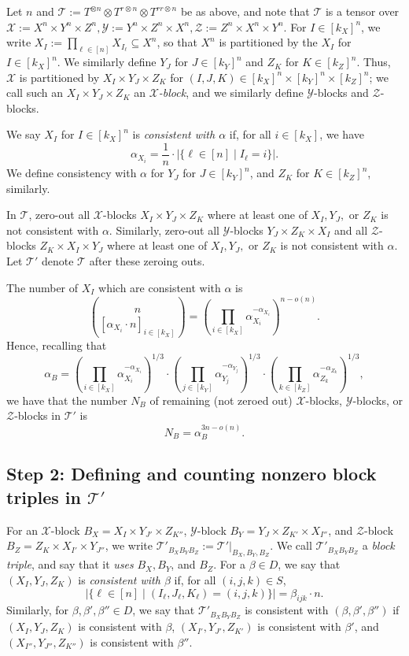 \PassOptionsToPackage{shortlabels}{enumitem}\documentclass[10pt,a4paper]{article}
\newcommand{\T}{\mathcal{T}}
\newcommand{\X}{\mathcal{X}}
\newcommand{\Y}{\mathcal{Y}}
\newcommand{\Z}{\mathcal{Z}}
\begin{document}
Let $n$ and $\T := T^{\otimes n} \otimes T^{r \otimes n} \otimes T^{rr \otimes n}$ be as above, and note that $\T$ is a tensor over $\X := X^n \times Y^n \times Z^n, \Y := Y^n \times Z^n \times X^n, \Z := Z^n \times X^n \times Y^n$. For $I \in [k_X]^n$, we write $X_I := \prod_{\ell \in [n]} X_{I_\ell} \subseteq X^n$, so that $X^n$ is partitioned by the $X_I$ for $I \in [k_X]^n$. We similarly define $Y_J$ for $J \in [k_Y]^n$ and $Z_K$ for $K \in [k_Z]^n$. Thus, $\X$ is partitioned by $X_I \times Y_J \times Z_K$ for $(I,J,K) \in [k_X]^n \times [k_Y]^n \times [k_Z]^n$; we call such an $X_I \times Y_J \times Z_K$ an \emph{$\X$-block}, and we similarly define $\Y$-blocks and $\Z$-blocks.

We say $X_I$ for $I \in [k_X]^n$ is \emph{consistent with $\alpha$} if, for all $i \in [k_X]$, we have $$\alpha_{X_i} = \frac{1}{n} \cdot | \{ \ell \in [n] \mid I_\ell = i \} |.$$ We define consistency with $\alpha$ for $Y_J$ for $J \in [k_Y]^n$, and $Z_K$ for $K \in [k_Z]^n$, similarly.

In $\T$, zero-out all $\X$-blocks $X_I \times Y_J \times Z_K$ where at least one of $X_I,Y_J,$ or $Z_K$ is not consistent with $\alpha$. Similarly, zero-out all $\Y$-blocks $Y_J \times Z_K \times X_I$ and all $\Z$-blocks $Z_K \times X_I \times Y_J$ where at least one of $X_I,Y_J,$ or $Z_K$ is not consistent with $\alpha$. Let $\T'$ denote $\T$ after these zeroing outs.

The number of $X_I$ which are consistent with $\alpha$ is $$\binom{n}{[\alpha_{X_i}\cdot n]_{i \in [k_X]}} = \left( \prod_{i \in [k_X]} \alpha_{X_i}^{-\alpha_{X_i}} \right)^{n - o(n)}.$$
Hence, recalling that $$\alpha_B = \left( \prod_{i \in [k_X]} \alpha_{X_i}^{-\alpha_{X_i}} \right)^{1/3} \cdot \left( \prod_{j \in [k_Y]} \alpha_{Y_j}^{-\alpha_{Y_j}} \right)^{1/3} \cdot \left( \prod_{k \in [k_Z]} \alpha_{Z_k}^{-\alpha_{Z_k}} \right)^{1/3},$$ we have that the number $N_B$ of remaining (not zeroed out) $\X$-blocks, $\Y$-blocks, or $\Z$-blocks in $\T'$ is $$N_B = \alpha_B^{3n - o(n)}.$$

\subsection{Step 2: Defining and counting nonzero block triples in \texorpdfstring{$\T'$}{T'}}

For an $\X$-block $B_X = X_I \times Y_{J'} \times Z_{K''}$, $\Y$-block $B_Y = Y_{J} \times Z_{K'} \times X_{I''}$, and $\Z$-block $B_Z = Z_{K} \times X_{I'} \times Y_{J''}$, we write $\T'_{B_X B_Y B_Z} := \T'|_{B_X,B_Y,B_Z}$. We call $\T'_{B_X B_Y B_Z} $ a \emph{block triple}, and say that it \emph{uses} $B_X,B_Y$, and $B_Z$. For a $\beta \in D$, we say that $(X_I,Y_J,Z_K)$ is \emph{consistent with $\beta$} if, for all $(i,j,k) \in S$,
$$|\{ \ell \in [n] \mid (I_\ell,J_\ell,K_\ell)=(i,j,k) \}| = \beta_{ijk} \cdot n.$$
Similarly, for $\beta, \beta', \beta'' \in D$, we say that $\T'_{B_X B_Y B_Z}$ is consistent with $(\beta,\beta',\beta'')$ if $(X_I,Y_J,Z_K)$ is consistent with $\beta$, $(X_{I'},Y_{J'},Z_{K'})$ is consistent with $\beta'$, and $(X_{I''},Y_{J''},Z_{K''})$ is consistent with $\beta''$.
\end{document}
